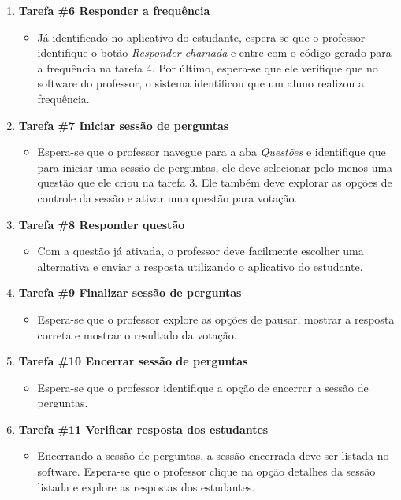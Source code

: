 \begin{enumerate}[label={},leftmargin=*]
  \item \textbf{Tarefa \#6 Responder a frequência}
  \begin{itemize}
    \item Já identificado no aplicativo do estudante, espera-se que o professor identifique
    o botão \textit{Responder chamada} e entre com o código gerado para a frequência na tarefa 4.
    Por último, espera-se que ele verifique que no software do professor, o sistema identificou
    que um aluno realizou a frequência.
  \end{itemize}

  \item \textbf{Tarefa \#7 Iniciar sessão de perguntas}
  \begin{itemize}
    \item  Espera-se que o professor navegue para a aba \textit{Questões} e identifique
    que para iniciar uma sessão de perguntas, ele deve selecionar pelo menos uma questão que ele criou
    na tarefa 3. Ele também deve explorar as opções de controle da sessão e ativar uma questão para votação.
  \end{itemize}

  \item \textbf{Tarefa \#8 Responder questão}
  \begin{itemize}
    \item Com a questão já ativada, o professor deve facilmente escolher uma alternativa e
    enviar a resposta utilizando o aplicativo do estudante.
  \end{itemize}

  \item \textbf{Tarefa \#9 Finalizar sessão de perguntas}
  \begin{itemize}
    \item Espera-se que o professor explore as opções de pausar, mostrar a resposta correta e mostrar
    o resultado da votação.
  \end{itemize}

  \item \textbf{Tarefa \#10 Encerrar sessão de perguntas}
  \begin{itemize}
    \item Espera-se que o professor identifique a opção de encerrar a sessão de perguntas.
  \end{itemize}

  \item \textbf{Tarefa \#11 Verificar resposta dos estudantes}
  \begin{itemize}
    \item Encerrando a sessão de perguntas, a sessão encerrada deve ser listada no software.
    Espera-se que o professor clique na opção detalhes da sessão listada e explore as respostas dos estudantes.
  \end{itemize}
\end{enumerate}


